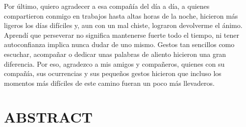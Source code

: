 \documentclass[12pt,letterpaper,oneside]{article}
\begin{document}
Por último, quiero agradecer a esa compañía del día a día, a quienes compartieron conmigo en trabajos hasta altas horas de la noche, hicieron más ligeros los días difíciles y, aun con un mal chiste, lograron devolverme el ánimo. Aprendí que perseverar no significa mantenerse fuerte todo el tiempo, ni tener autoconfianza implica nunca dudar de uno mismo. Gestos tan sencillos como escuchar, acompañar o dedicar unas palabras de aliento hicieron una gran diferencia. Por eso, agradezco a mis amigos y compañeros, quienes con su compañía, sus ocurrencias y sus pequeños gestos hicieron que incluso los momentos más difíciles de este camino fueran un poco más llevaderos.

\clearpage

\tableofcontents

\clearpage
\section*{ABSTRACT}
\end{document}
